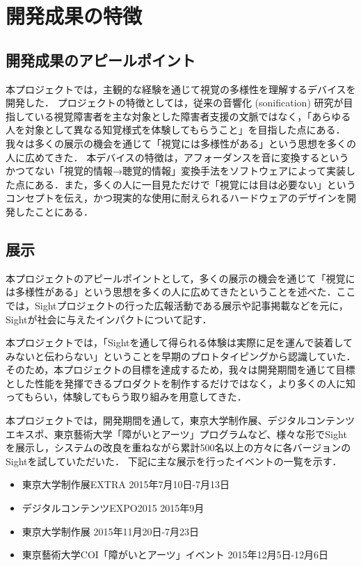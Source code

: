 \section{開発成果の特徴}
\subsection{開発成果のアピールポイント}
本プロジェクトでは，主観的な経験を通じて視覚の多様性を理解するデバイスを開発した．
プロジェクトの特徴としては，従来の音響化 (sonification) 研究が目指している視覚障害者を主な対象とした障害者支援の文脈ではなく，「あらゆる人を対象として異なる知覚様式を体験してもらうこと」を目指した点にある．我々は多くの展示の機会を通じて「視覚には多様性がある」という思想を多くの人に広めてきた．
本デバイスの特徴は，アフォーダンスを音に変換するというかつてない「視覚的情報→聴覚的情報」変換手法をソフトウェアによって実装した点にある．また，多くの人に一目見ただけで「視覚には目は必要ない」というコンセプトを伝え，かつ現実的な使用に耐えられるハードウェアのデザインを開発したことにある．

\subsection{展示}
本プロジェクトのアピールポイントとして，多くの展示の機会を通じて「視覚には多様性がある」という思想を多くの人に広めてきたということを述べた．ここでは，Sightプロジェクトの行った広報活動である展示や記事掲載などを元に，Sightが社会に与えたインパクトについて記す．


本プロジェクトでは，「Sightを通して得られる体験は実際に足を運んで装着してみないと伝わらない」ということを早期のプロトタイピングから認識していた．そのため，本プロジェクトの目標を達成するため，我々は開発期間を通じて目標とした性能を発揮できるプロダクトを制作するだけではなく，より多くの人に知ってもらい，体験してもらう取り組みを用意してきた．

本プロジェクトでは，開発期間を通して，東京大学制作展、デジタルコンテンツエキスポ、東京藝術大学「障がいとアーツ」プログラムなど、様々な形でSightを展示し，システムの改良を重ねながら累計500名以上の方々に各バージョンのSightを試していただいた．
下記に主な展示を行ったイベントの一覧を示す．

\begin{itemize}
 \item 東京大学制作展EXTRA 2015年7月10日-7月13日
 \item デジタルコンテンツEXPO2015 2015年9月
 \item 東京大学制作展 2015年11月20日-7月23日
 \item 東京藝術大学COI「障がいとアーツ」イベント 2015年12月5日-12月6日
\end{itemize}


